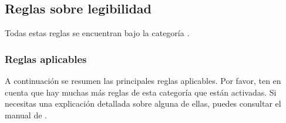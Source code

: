 \subsection{Reglas sobre legibilidad}

Todas estas reglas se encuentran bajo la categoría .

\subsubsection{Reglas aplicables}

A continuación se resumen las principales reglas aplicables. Por favor, ten en cuenta que hay muchas más
reglas de esta categoría que están activadas. Si necesitas una explicación detallada sobre alguna de ellas,
puedes consultar el manual de .

